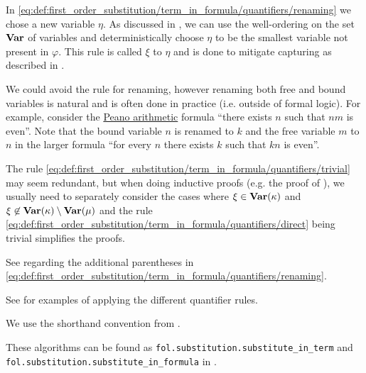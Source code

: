 \begin{comments}
  \item In \eqref{eq:def:first_order_substitution/term_in_formula/quantifiers/renaming} we chose a new variable \( \eta \). As discussed in , we can use the well-ordering on the set \( \operatorname{\mathbf{Var}} \) of variables and deterministically choose \( \eta \) to be the smallest variable not present in \( \varphi \). This rule is called  \( \xi \) to \( \eta \) and is done to mitigate capturing as described in .

  \item We could avoid the rule for renaming, however renaming both free and bound variables is natural and is often done in practice (i.e. outside of formal logic). For example, consider the \hyperref[def:peano_arithmetic]{Peano arithmetic} formula \enquote{there exists \( n \) such that \( nm \) is even}. Note that the bound variable \( n \) is renamed to \( k \) and the free variable \( m \) to \( n \) in the larger formula \enquote{for every \( n \) there exists \( k \) such that \( kn \) is even}.

  \item The rule \eqref{eq:def:first_order_substitution/term_in_formula/quantifiers/trivial} may seem redundant, but when doing inductive proofs (e.g. the proof of ), we usually need to separately consider the cases where \( \xi \in \operatorname{\mathbf{Var}}(\kappa) \) and \( \xi \not\in \operatorname{\mathbf{Var}}(\kappa) \setminus \operatorname{\mathbf{Var}}(\mu) \) and the rule \eqref{eq:def:first_order_substitution/term_in_formula/quantifiers/direct} being trivial simplifies the proofs.

  \item See  regarding the additional parentheses in \eqref{eq:def:first_order_substitution/term_in_formula/quantifiers/renaming}.

  \item See  for examples of applying the different quantifier rules.

  \item We use the shorthand convention from .

  \item These algorithms can be found as \texttt{fol.substitution.substitute\_in\_term} and \texttt{fol.substitution.substitute\_in\_formula} in \cite{code}.
\end{comments}


